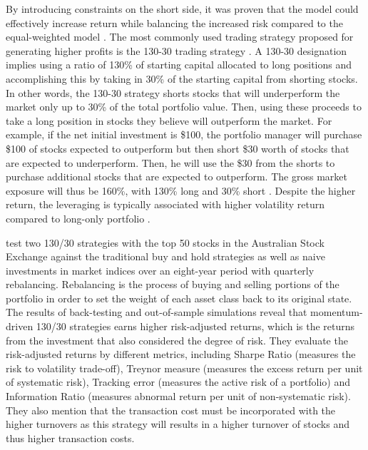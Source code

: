 \documentclass{article}
\begin{document}
By introducing constraints on the short side, it was proven that the model could effectively increase return while balancing the increased risk compared to the equal-weighted model \citep{abate2022portfolio, johnson2007empirical}. The most commonly used trading strategy proposed for generating higher profits is the 130-30 trading strategy \citep{lo2008130, frino2008performance, sorensen2006aspects, johnson2007empirical}. A 130-30 designation implies using a ratio of 130\% of starting capital allocated to long positions and accomplishing this by taking in 30\% of the starting capital from shorting stocks. In other words, the 130-30 strategy shorts stocks that will underperform the market only up to 30\% of the total portfolio value. Then, using these proceeds to take a long position in stocks they believe will outperform the market. For example, if the net initial investment is \$100, the portfolio manager will purchase \$100 of stocks expected to outperform but then short \$30 worth of stocks that are expected to underperform. Then, he will use the \$30 from the shorts to purchase additional stocks that are expected to outperform. The gross market exposure will thus be 160\%, with 130\% long and 30\% short \citep{johnson2007empirical}. Despite the higher return, the leveraging is typically associated with higher volatility return compared to long-only portfolio \citep{sorensen2006aspects}. 

\cite{frino2008performance} test two 130/30 strategies with the top 50 stocks in the Australian Stock Exchange against the traditional buy and hold strategies as well as naive investments in market indices over an eight-year period with quarterly rebalancing. Rebalancing is the process of buying and selling portions of the portfolio in order to set the weight of each asset class back to its original state. The results of back-testing and out-of-sample simulations reveal that momentum-driven 130/30 strategies earns higher risk-adjusted returns, which is the returns from the investment that also considered the degree of risk. 
They evaluate the risk-adjusted returns by different metrics, including Sharpe Ratio (measures the risk to volatility trade-off), Treynor measure (measures the excess return per unit of systematic risk), Tracking error (measures the active risk of a portfolio) and Information Ratio (measures abnormal return per unit of non-systematic risk). They also mention that the transaction cost must be incorporated with the higher turnovers as this strategy will results in a higher turnover of stocks and thus higher transaction costs. 
\end{document}
